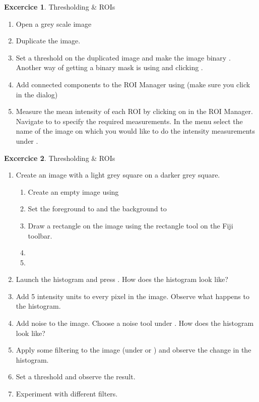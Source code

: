 \documentclass[xcolor=table]{scrartcl}
\theoremstyle{definition}
\newtheorem{exercice}{Excercice}
\begin{document}
\begin{exercice} Thresholding \& ROIs
  \begin{enumerate}
  \item Open a grey scale image
  \item Duplicate the image.
  \item Set a threshold on the duplicated image and make the image binary . Another way of getting a binary mask is using  and clicking . 
  \item Add connected components to the ROI Manager using  (make sure you click  in the  dialog)
  \item Measure the mean intensity of each ROI by clicking on  in the ROI Manager. Navigate to  to specify the required measurements. In the  menu select the name of the image on which you would like to do the intensity measurements under .
  
  \end{enumerate}
\end{exercice}

\begin{exercice} Thresholding \& ROIs
  \begin{enumerate}
     \item Create an image with a light grey square on a darker grey
      square.
      \begin{enumerate}
          \item Create an empty image using 
          \item {} Set the foreground to  and the background to 
          \item Draw a rectangle on the image using the rectangle tool on the Fiji toolbar.
          \item {}
          \item {}
        \end{enumerate}
      \item Launch the histogram and press . How does the histogram look like?
      \item Add 5 intensity units to every pixel in the image.   Observe what happens to the histogram.
      \item Add noise to the image. Choose a noise tool under   . How does the histogram look like?
    \item Apply some filtering to the image (under  or ) and observe the change in the histogram.
    \item Set a threshold and observe the result.
    \item  Experiment with different filters.
  \end{enumerate}
\end{exercice}
\end{document}
